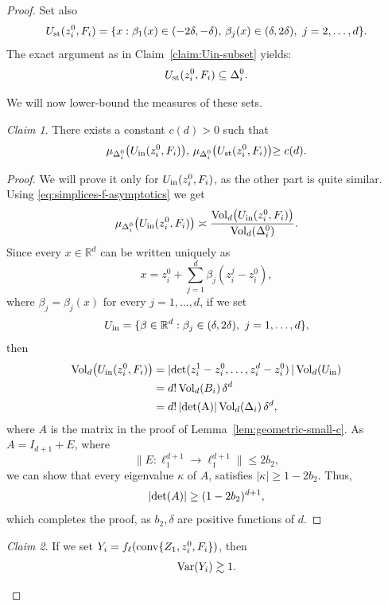 \documentclass[10pt]{amsart}
\newcommand{\1}{\textbf{1}}
\newcommand{\conv}{{\rm conv}}
\newcommand{\vol}{{\rm Vol}}
\newcommand{\Var}{{\rm Var}}
\numberwithin{equation}{section} %
\theoremstyle{remark}
\newtheorem{claim}{Claim}
\theoremstyle{definition}
\begin{document}
\begin{proof}
Set also \[U_{\rm st}(z_i^0,F_i)=\{x:\beta_1(x) \in (-2\delta,-\delta), \, \beta_j(x) \in (\delta,2\delta), \ j=2,\ldots,d\}.\] The exact argument as in Claim~\ref{claim:Uin-subset} yields: 
    \begin{equation}\label{eq:Ust-subset}
        U_{\rm st}(z_i^0,F_i) \subseteq \Delta_i^0.
    \end{equation}

We will now lower-bound the measures of these sets.

\begin{claim}\label{claim:lower-bound-in-stacked}
        There exists a constant $c(d)>0$ such that \[\mu_{\Delta_i^0}\bigl(U_{\rm in}(z_i^0,F_i)\bigr),\,\mu_{\Delta_i^0}\bigl(U_{\rm st}(z_i^0,F_i)\bigl) \geq c(d).\]
\end{claim}

\begin{proof}
    We will prove it only for $U_{\rm in}(z_i^0,F_i)$, as the other part is quite similar. Using \eqref{eq:simplices-f-asymptotics} we get \[\mu_{\Delta_i^0}\bigl(U_{\rm in}(z_i^0,F_i)\bigr) \asymp \frac{\vol_d\bigl(U_{\rm in}(z_i^0,F_i)\bigr)}{\vol_d(\Delta_i^0)}.\] Since every $x \in \mathbb{R}^d$ can be written uniquely as \[x=z_i^0+\sum_{j=1}^{d}\beta_j(z_i^j-z_i^0),\] where $\beta_j=\beta_j(x)$ for every $j=1,\ldots,d$, if we set \[U_{\rm in}=\{\beta \in \mathbb{R}^d: \beta_j \in (\delta,2\delta), \ j=1,\ldots,d\},\] then \begin{align*}
    \vol_d\bigl(U_{\rm in}(z_i^0,F_i)\bigr)&=|{\rm det}(z_i^1-z_i^0,\ldots,z_i^d-z_i^0)\,|\, \vol_d(U_{\rm in})\\
    &=d!\,\vol_d(B_i)\,\delta^d\\
    &=d! \,|{\rm det(A)|}\,\vol_d(\Delta_i)\,\delta^d,
    \end{align*} where $A$ is the matrix in the proof of Lemma~\ref{lem:geometric-small-c}. As $A=I_{d+1}+E$, where \[\|E:\ell_1^{d+1} \to \ell_1^{d+1}\| \leq 2b_2,\] we can show that every eigenvalue $\kappa$ of $A$, satisfies $|\kappa| \geq 1-2b_2$. Thus, \[|{\rm det}(A)| \geq (1-2b_2)^{d+1},\] which completes the proof, as $b_2,\delta$ are positive functions of $d$.
\end{proof}

\begin{claim}\label{claim:intermediate-variance}
    If we set $Y_i=f_\ell(\conv\{Z_1,z_i^0,F_i\})$, then \[\Var(Y_i) \gtrsim 1.\]
\end{claim}


\end{proof}
\end{document}

